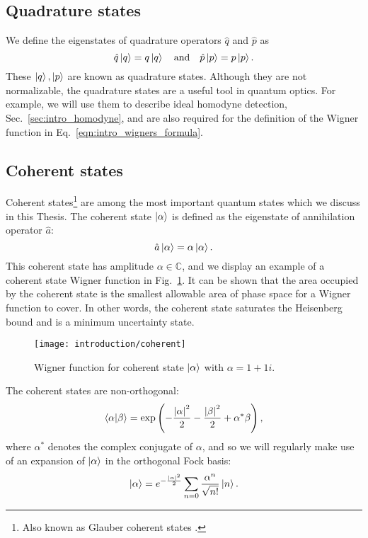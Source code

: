 \FloatBarrier
\subsection{Quadrature states}
We define the eigenstates of quadrature operators $\hat{q}$ and $\hat{p}$ as
\begin{equation}\label{eqn:intro_quadrature_state}
\hat{q}\ket{q} = q \ket{q} \qq{and} \hat{p}\ket{p} = p \ket{p}.
\end{equation}
These $\ket{q}, \ket{p}$ are known as quadrature states. Although they are not normalizable, the quadrature states are a useful tool in quantum optics. For example, we will use them to describe ideal homodyne detection, Sec.~\ref{sec:intro_homodyne}, and are also required for the definition of the Wigner function in Eq.~\ref{eqn:intro_wigners_formula}.


\FloatBarrier
\subsection{Coherent states}
Coherent states\footnote{Also known as Glauber coherent states \cite{Glauber1963}.} are among the most important quantum states which we discuss in this Thesis. The coherent state $\ket{\alpha}$ is defined as the eigenstate of annihilation operator $\hat{a}$:
\begin{equation}
\hat{a}\ket{\alpha} = \alpha \ket{\alpha}.
\end{equation}
This coherent state has amplitude $\alpha \in \mathbb{C}$, and we display an example of a coherent state Wigner function in Fig.~\ref{fig:intro_coherent_wigner}. It can be shown that the area occupied by the coherent state is the smallest allowable area of phase space for a Wigner function to cover. In other words, the coherent state saturates the Heisenberg bound and is a minimum uncertainty state.%

\begin{figure}[htp]
\centering
\captionsetup{width=0.8\linewidth}
\texttt{[image: introduction/coherent]}
\caption{\label{fig:intro_coherent_wigner} Wigner function for coherent state $\ket{\alpha}$ with $\alpha = 1 + 1i$.}
\end{figure}

\noindent The coherent states are non-orthogonal:
\begin{equation}
\ip{\alpha}{\beta} = \exp\left(- \frac{\left|\alpha\right|^2}{2} - \frac{\left|\beta\right|^2}{2} + \alpha^* \beta \right),
\end{equation}
where $\alpha^*$ denotes the complex conjugate of $\alpha$, and so we will regularly make use of an expansion of $\ket{\alpha}$ in the orthogonal Fock basis:
\begin{equation}\label{eqn:intro_coherent_fock}
\ket{\alpha} = e^{-\frac{\left|\alpha\right|^2}{2}} \sum_{n=0} \frac{\alpha^n}{\sqrt{n!}} \ket{n}.
\end{equation}

